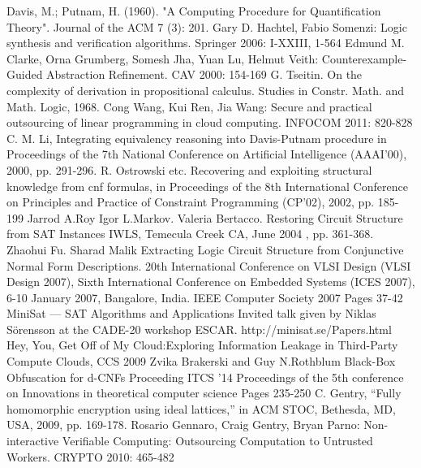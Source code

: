 \documentclass[runningheads,a4paper]{llncs}
\begin{document}
\begin{thebibliography}{4}


	Davis, M.; Putnam, H. (1960). "A Computing Procedure for Quantification Theory". Journal of the ACM 7 (3): 201.
	Gary D. Hachtel, Fabio Somenzi: Logic synthesis and verification algorithms. Springer 2006: I-XXIII, 1-564
	Edmund M. Clarke, Orna Grumberg, Somesh Jha, Yuan Lu, Helmut Veith: Counterexample-Guided Abstraction Refinement. CAV 2000: 154-169
	G. Tseitin. On the complexity of derivation in propositional calculus. Studies in Constr. Math. and Math. Logic, 1968.
	Cong Wang, Kui Ren, Jia Wang: Secure and practical outsourcing of linear programming in cloud computing. INFOCOM 2011: 820-828
	C. M. Li, Integrating equivalency reasoning into Davis-Putnam procedure in Proceedings of the 7th National Conference on Artificial Intelligence (AAAI'00), 2000, pp. 291-296.
	R. Ostrowski etc. Recovering and exploiting structural knowledge from cnf formulas, in Proceedings of the 8th International Conference on Principles and Practice of Constraint Programming (CP'02), 2002, pp. 185-199
	Jarrod A.Roy Igor L.Markov. Valeria Bertacco. Restoring Circuit Structure from SAT Instances IWLS, Temecula Creek CA, June 2004 , pp. 361-368.
	Zhaohui Fu. Sharad Malik Extracting Logic Circuit Structure from Conjunctive Normal Form Descriptions. 20th International Conference on VLSI Design (VLSI Design 2007), Sixth International Conference on Embedded Systems (ICES 2007), 6-10 January 2007, Bangalore, India. IEEE Computer Society 2007 Pages 37-42
	MiniSat — SAT Algorithms and Applications Invited talk given by Niklas Sörensson at the CADE-20 workshop ESCAR. http://minisat.se/Papers.html
	Hey, You, Get Off of My Cloud:Exploring Information Leakage in Third-Party Compute Clouds, CCS 2009
	Zvika Brakerski and Guy N.Rothblum Black-Box Obfuscation for d-CNFs  Proceeding ITCS '14 Proceedings of the 5th conference on Innovations in theoretical computer science Pages 235-250
	C. Gentry, “Fully homomorphic encryption using ideal lattices,” in ACM STOC, Bethesda, MD, USA, 2009, pp. 169-178.
	Rosario Gennaro, Craig Gentry, Bryan Parno: Non-interactive Verifiable Computing: Outsourcing Computation to Untrusted Workers. CRYPTO 2010: 465-482

\end{thebibliography}
\end{document}
